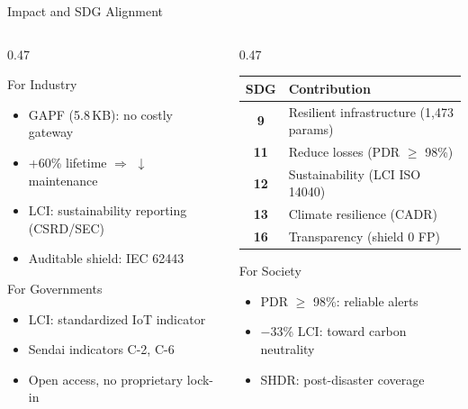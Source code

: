 \documentclass[10pt,aspectratio=169]{beamer}
\begin{document}
\begin{frame}[t]{Impact and SDG Alignment}
\begin{columns}[T]
\begin{column}{0.47\textwidth}
  \begin{block}{\faBriefcase\; For Industry}
    \begin{itemize}\footnotesize\setlength{\itemsep}{1pt}
      \item GAPF (5.8\,KB): no costly gateway
      \item +60\% lifetime $\Rightarrow$ $\downarrow$ maintenance
      \item LCI: sustainability reporting (CSRD/SEC)
      \item Auditable shield: IEC 62443
    \end{itemize}
  \end{block}
  \vspace{1pt}
  \begin{block}{\faUniversity\; For Governments}
    \begin{itemize}\footnotesize\setlength{\itemsep}{1pt}
      \item LCI: standardized IoT indicator
      \item Sendai indicators C-2, C-6
      \item Open access, no proprietary lock-in
    \end{itemize}
  \end{block}
\end{column}
\begin{column}{0.47\textwidth}
  \footnotesize
  \renewcommand{\arraystretch}{1.0}
  \begin{tabular}{@{}cl@{}}
    \toprule
    \textbf{SDG} & \textbf{Contribution} \\
    \midrule
    \textbf{9} & Resilient infrastructure (1,473 params) \\
    \textbf{11} & Reduce losses (PDR $\geq$ 98\%) \\
    \textbf{12} & Sustainability (LCI ISO 14040) \\
    \textbf{13} & Climate resilience (CADR) \\
    \textbf{16} & Transparency (shield 0 FP) \\
    \bottomrule
  \end{tabular}
  \vspace{1pt}
  \begin{block}{\faUsers\; For Society}
    \begin{itemize}\footnotesize\setlength{\itemsep}{1pt}
      \item PDR $\geq$ 98\%: reliable alerts
      \item $-$33\% LCI: toward carbon neutrality
      \item SHDR: post-disaster coverage
    \end{itemize}
  \end{block}
\end{column}
\end{columns}
\end{frame}
\end{document}
